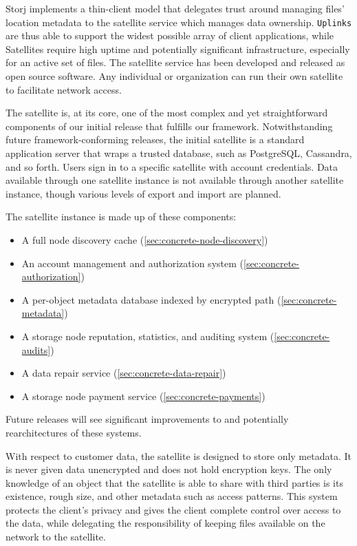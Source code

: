 \documentclass[11pt,fleqn,openany]{book}
\newcommand{\x}[1]{{\tt #1}} \newcommand{\code}[1]{{\em #1}}
\begin{document}
Storj implements a thin-client model that delegates trust around managing
files' location metadata to the satellite service which manages data
ownership. \x{Uplinks}
are thus able to support the widest possible array of client applications, while
Satellites require high uptime and potentially significant infrastructure,
especially for an active set of files.
The satellite service has been developed and released as open source software.
Any individual or organization can run their own satellite to facilitate
network access.

The satellite is, at its core, one of the most complex and yet
straightforward components of our initial release that fulfills our framework.
Notwithstanding future framework-conforming releases, the initial satellite
is a standard application server that wraps a trusted database, such as
PostgreSQL, Cassandra, and so forth. Users sign in to a specific
satellite with account credentials.
Data available through one satellite instance is
not available through another satellite instance, though various levels of
export and import are planned.

The satellite instance is made up of these components:
\begin{itemize}
\item A full node discovery cache (\ref{sec:concrete-node-discovery})
\item An account management and authorization system
  (\ref{sec:concrete-authorization})
\item A per-object metadata database indexed by encrypted path
  (\ref{sec:concrete-metadata})
\item A storage node reputation, statistics, and auditing system
  (\ref{sec:concrete-audits})
\item A data repair service (\ref{sec:concrete-data-repair})
\item A storage node payment service (\ref{sec:concrete-payments})
\end{itemize}

Future releases will see significant improvements to and potentially
rearchitectures of these systems.

With respect to customer data, the satellite is designed to store only
metadata. It is never given data unencrypted and does not hold encryption keys.
The only knowledge of an object that the satellite is able to share with
third parties is its existence, rough size, and other metadata such as access
patterns.
This system protects the client's privacy and gives the client complete
control over access to the data,
while delegating the responsibility of keeping files available on the network
to the satellite.
\end{document}
